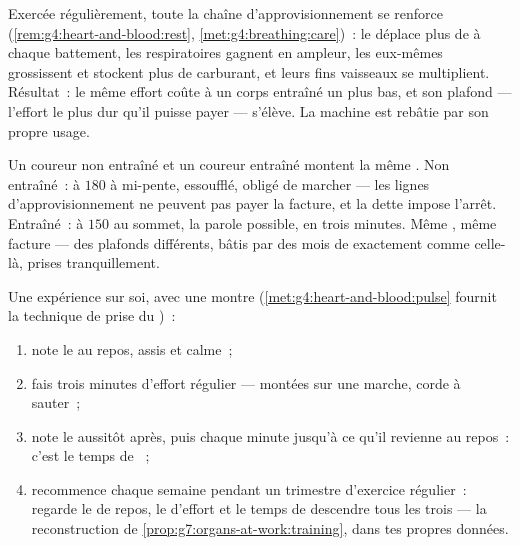 \begin{proposition}\label{prop:g7:organs-at-work:training}
Exercée régulièrement, toute la chaîne d'approvisionnement se
renforce (\cref{rem:g4:heart-and-blood:rest},
\cref{met:g4:breathing:care})~: le  déplace plus de  à
chaque battement, les  respiratoires gagnent en ampleur, les
 eux-mêmes grossissent et stockent plus de carburant, et
leurs fins vaisseaux se multiplient. Résultat~: le même effort coûte
à un corps entraîné un  plus bas, et son plafond --- l'effort
le plus dur qu'il puisse payer --- s'élève. La machine est rebâtie
par son propre usage.
\end{proposition}
\admitted

\begin{example}\label{ex:g7:organs-at-work:runners}
Un coureur non entraîné et un coureur entraîné montent la même .
Non entraîné~:  à $180$ à mi-pente, essoufflé, obligé de
marcher --- les lignes d'approvisionnement ne peuvent pas payer la
facture, et la dette impose l'arrêt. Entraîné~:  à $150$ au
sommet, la parole possible,  en trois minutes. Même
, même facture --- des plafonds différents, bâtis par des mois
de  exactement comme celle-là, prises tranquillement.
\end{example}

\begin{method}\label{met:g7:organs-at-work:read}
Une expérience sur soi, avec une montre
(\cref{met:g4:heart-and-blood:pulse} fournit la technique de prise
du )~:
\begin{enumerate}
  \item note le  au repos, assis et calme~;
  \item fais trois minutes d'effort régulier --- montées sur une
        marche, corde à sauter~;
  \item note le  aussitôt après, puis chaque minute jusqu'à ce
        qu'il revienne au repos~: c'est le temps de ~;
  \item recommence chaque semaine pendant un trimestre d'exercice
        régulier~: regarde le  de repos, le  d'effort et
        le temps de  descendre tous les trois --- la
        reconstruction de
        \cref{prop:g7:organs-at-work:training}, dans tes propres
        données.
\end{enumerate}
\end{method}

